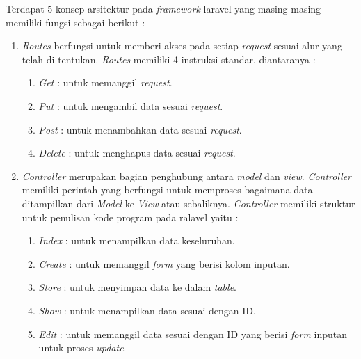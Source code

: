 Terdapat 5 konsep arsitektur pada \textit{framework} laravel yang masing-masing memiliki fungsi sebagai berikut \cite{6} :

\begin{enumerate}

\item \textit{Routes} berfungsi untuk memberi akses pada setiap \textit{request} sesuai alur yang telah di tentukan. \textit{Routes} memiliki 4 instruksi standar, diantaranya :

\begin{enumerate}

\item \textit{Get} \kern 1.5pc : untuk memanggil \textit{request}.

\item \textit{Put}	\kern 1.5pc : untuk mengambil data sesuai \textit{request}.

\item \textit{Post}	\kern 1.2pc : untuk menambahkan data sesuai \textit{request}.

\item \textit{Delete} \kern 0.3pc : untuk menghapus data sesuai \textit{request}.
\end{enumerate}

\item \textit{Controller} merupakan bagian penghubung antara \textit{model} dan \textit{view}. \textit{Controller} memiliki perintah yang berfungsi untuk memproses bagaimana data ditampilkan dari \textit{Model} ke \textit{View} atau sebaliknya. \textit{Controller} memiliki struktur untuk penulisan kode program pada ralavel yaitu :

\begin{enumerate}

\item \textit{Index} \kern 0.7pc : untuk menampilkan data keseluruhan.

\item \textit{Create} \kern 0.2pc : untuk memanggil \textit{form} yang berisi kolom inputan.

\item \textit{Store} \kern 0.8pc : untuk menyimpan data ke dalam \textit{table}.

\item \textit{Show} \kern 0.7pc : untuk menampilkan data sesuai dengan ID.

\item \textit{Edit} \kern 1.1pc : untuk memanggil data sesuai dengan ID yang berisi \textit{form} inputan untuk proses \textit{update}.


\end{enumerate}
\end{enumerate}
